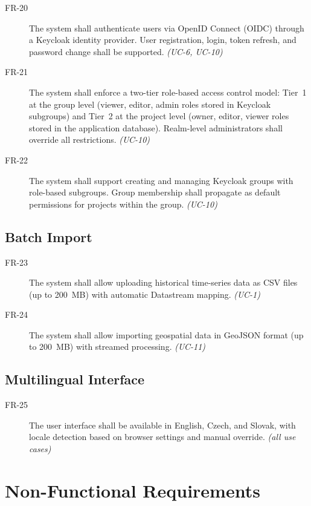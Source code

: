 \begin{description}
  \item[FR-20] The system shall authenticate users via OpenID Connect (OIDC) through a
    Keycloak identity provider. User registration, login, token refresh, and password change
    shall be supported. \emph{(UC-6, UC-10)}
  \item[FR-21] The system shall enforce a two-tier role-based access control model:
    Tier~1 at the group level (viewer, editor, admin roles stored in Keycloak subgroups) and
    Tier~2 at the project level (owner, editor, viewer roles stored in the application database).
    Realm-level administrators shall override all restrictions. \emph{(UC-10)}
  \item[FR-22] The system shall support creating and managing Keycloak groups with role-based
    subgroups. Group membership shall propagate as default permissions for projects within
    the group. \emph{(UC-10)}
\end{description}

\subsection{Batch Import}
\label{sec:req-functional-batch}

\begin{description}
  \item[FR-23] The system shall allow uploading historical time-series data as CSV files
    (up to 200~MB) with automatic Datastream mapping. \emph{(UC-1)}
  \item[FR-24] The system shall allow importing geospatial data in GeoJSON format (up to
    200~MB) with streamed processing. \emph{(UC-11)}
\end{description}

\subsection{Multilingual Interface}
\label{sec:req-functional-i18n}

\begin{description}
  \item[FR-25] The user interface shall be available in English, Czech, and Slovak, with
    locale detection based on browser settings and manual override. \emph{(all use cases)}
\end{description}

\section{Non-Functional Requirements}
\label{sec:req-nonfunctional}


